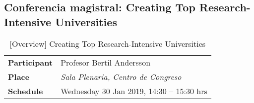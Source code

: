 \documentclass[11pt,a4paper]{article}
\begin{document}









\clearpage

\subsection{Conferencia magistral: Creating Top Research-Intensive Universities}\label{sec:conference2}

\parencite{Andersson2019}
\begin{table}[h] %
\centering
\begin{tabular}{|l|l|}
\hline
\textbf{Participant} & Profesor Bertil Andersson \\
\textbf{Place}       & \emph{Sala Plenaria, Centro de Congreso} \\
\textbf{Schedule}    & Wednesday 30 Jan 2019, 14:30 – 15:30 hrs \\
\hline
\end{tabular}
\caption{[Overview] Creating Top Research-Intensive Universities}\label{tab:table}
\end{table}




\end{document}
